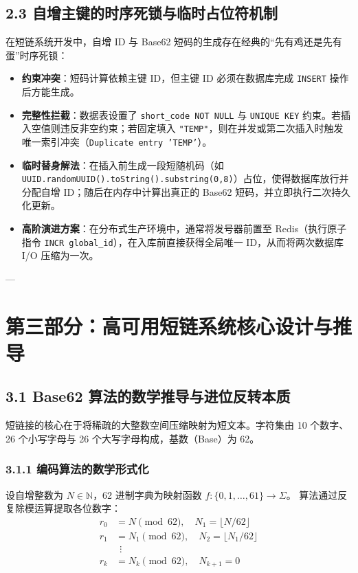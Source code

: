 \documentclass[11pt,a4paper]{ctexart}
\begin{document}
\subsection{2.3 自增主键的时序死锁与临时占位符机制}
在短链系统开发中，自增 ID 与 Base62 短码的生成存在经典的“先有鸡还是先有蛋”时序死锁：
\begin{itemize}
    \item \textbf{约束冲突}：短码计算依赖主键 ID，但主键 ID 必须在数据库完成 \texttt{INSERT} 操作后方能生成。
    \item \textbf{完整性拦截}：数据表设置了 \texttt{short\_code NOT NULL} 与 \texttt{UNIQUE KEY} 约束。若插入空值则违反非空约束；若固定填入 \texttt{"TEMP"}，则在并发或第二次插入时触发唯一索引冲突（\texttt{Duplicate entry 'TEMP'}）。
    \item \textbf{临时替身解法}：在插入前生成一段短随机码（如 \lstinline|UUID.randomUUID().toString().substring(0,8)|）占位，使得数据库放行并分配自增 ID；随后在内存中计算出真正的 Base62 短码，并立即执行二次持久化更新。
    \item \textbf{高阶演进方案}：在分布式生产环境中，通常将发号器前置至 Redis（执行原子指令 \texttt{INCR global\_id}），在入库前直接获得全局唯一 ID，从而将两次数据库 I/O 压缩为一次。
\end{itemize}

---

\section{第三部分：高可用短链系统核心设计与推导}

\subsection{3.1 Base62 算法的数学推导与进位反转本质}
短链接的核心在于将稀疏的大整数空间压缩映射为短文本。字符集由 10 个数字、26 个小写字母与 26 个大写字母构成，基数（Base）为 62。

\subsubsection{3.1.1 编码算法的数学形式化}
设自增整数为 $N \in \mathbb{N}$，62 进制字典为映射函数 $f: \{0, 1, \dots, 61\} \to \Sigma$。
算法通过反复除模运算提取各位数字：
\begin{align*}
r_0 &= N \pmod{62}, \quad N_1 = \lfloor N / 62 \rfloor \\
r_1 &= N_1 \pmod{62}, \quad N_2 = \lfloor N_1 / 62 \rfloor \\
&\ \ \vdots \\
r_k &= N_k \pmod{62}, \quad N_{k+1} = 0
\end{align*}
\end{document}
